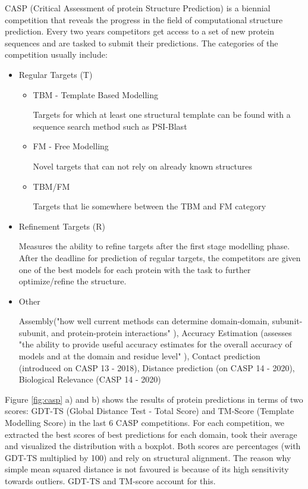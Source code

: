 CASP (Critical Assessment of protein Structure Prediction) is a biennial competition that reveals the progress in the field of computational structure prediction. 
Every two years competitors get access to a set of new protein sequences and are tasked to submit their predictions. 
The categories of the competition usually include:
\begin{itemize}
    \item Regular Targets (T)
    
    \begin{itemize}
        \item TBM - Template Based Modelling
        
        Targets for which at least one structural template can be found with a sequence search method such as PSI-Blast
        \item FM - Free Modelling
        
        Novel targets that can not rely on already known structures
        \item TBM/FM
        
        Targets that lie somewhere between the TBM and FM category
    \end{itemize}
    
    \item Refinement Targets (R)
    
        Measures the ability to refine targets after the first stage modelling phase. After the deadline for prediction of regular targets, the competitors are given one of the best models for each protein with the task to further optimize/refine the structure.
        
    \item Other
    
    Assembly("how well current methods can determine domain-domain, subunit-subunit, and protein-protein interactions" \cite{casp}), Accuracy Estimation (assesses "the ability to provide useful accuracy estimates for the overall accuracy of models and at the domain and residue level" \cite{casp}), Contact prediction (introduced on CASP 13 - 2018), Distance prediction (on CASP 14 - 2020), Biological Relevance (CASP 14 - 2020) \cite{casp, casp13}
\end{itemize}

Figure \ref{fig:casp} a) and b) shows the results of protein predictions in terms of two scores: GDT-TS (Global Distance Test - Total Score) and TM-Score (Template Modelling Score) in the last 6 CASP competitions. 
For each competition, we extracted the best scores of best predictions for each domain, took their average and visualized the distribution with a boxplot.
Both scores are percentages (with GDT-TS multiplied by 100) and rely on structural alignment. 
The reason why simple mean squared distance is not favoured is because of its high sensitivity towards outliers. 
GDT-TS and TM-score account for this. 

